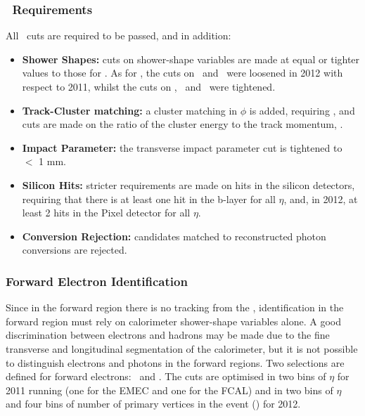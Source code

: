 \subsubsection{\tightPP\ Requirements}


All \mediumPP\ cuts are required to be passed, and in addition:

\begin{itemize}
    \item {\bf Shower Shapes:} cuts on shower-shape variables are made at equal
    or tighter values to those for \mediumPP. As for \mediumPP,
    the cuts on \Reta\ and \Rhad\ were loosened in 2012 with respect to 2011, 
    whilst the cuts on  \wetatwo, \Eratio\ and
    \wstot\ were tightened.

    \item {\bf Track-Cluster matching:} a cluster matching in $\phi$ is added,
    requiring , and cuts are made on the ratio of the cluster
    energy to the track momentum, \Eoverp.

    \item {\bf Impact Parameter:} the
    transverse impact parameter cut is tightened to \dzero\ $<$ 1 mm.

    \item {\bf Silicon Hits:} stricter requirements are made on hits in the
    silicon detectors, requiring that there is at least one hit in the b-layer for
    all $\eta$, and, in 2012, at least 2 hits in the Pixel detector for all
    $\eta$.

    \item {\bf Conversion Rejection:} candidates matched to reconstructed photon
    conversions are rejected.

\end{itemize}

\subsubsection{Forward Electron Identification}

Since in the forward region there is no tracking from the \id,
identification in the forward region must rely on calorimeter shower-shape
variables alone. A good discrimination between electrons and hadrons may be made
due to the fine transverse and longitudinal segmentation of the calorimeter, but
it is not possible to distinguish electrons and photons in the forward regions.
Two selections are defined for forward electrons: \loose\ and \tight. The cuts
are optimised in two bins of $\eta$ for 2011 running (one for the EMEC and one
for the FCAL) and in two bins of $\eta$ and four bins of number of primary
vertices in the event (\nPV) for 2012.

